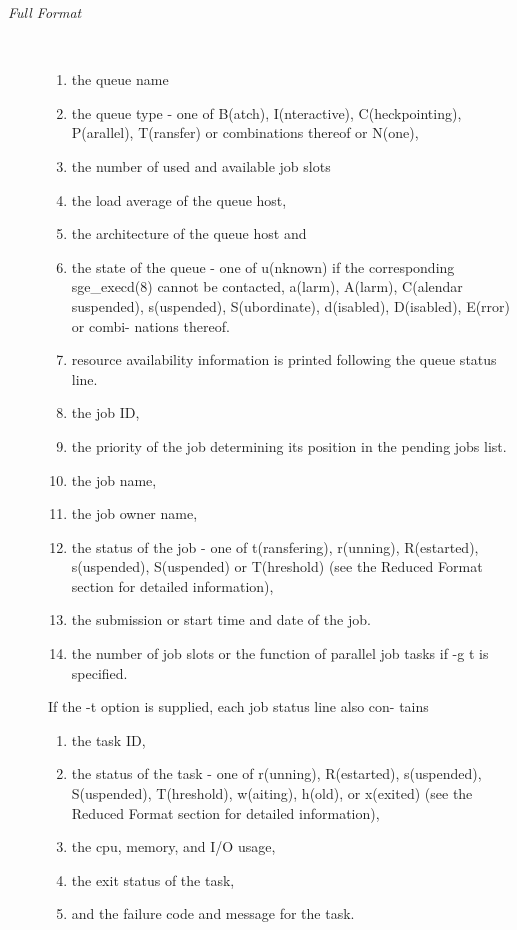 \documentclass[11pt,final,oneside]{fithesis}
\begin{document}
\begin{description}
\item[\emph{Full Format}]
\\
\begin{enumerate}
\item[] the queue name
\item[] the  queue  type  -  one   of   B(atch),   I(nteractive),
        C(heckpointing),  P(arallel),  T(ransfer) or combinations
        thereof or N(one),
\item[] the number of used and available job slots
\item[] the load average of the queue host,
\item[] the architecture of the queue host and
\item[] the state  of  the  queue  -  one  of  u(nknown)  if  the
        corresponding  sge\_execd(8) cannot be contacted, a(larm),
        A(larm),     C(alendar      suspended),      s(uspended),
        S(ubordinate),  d(isabled), D(isabled), E(rror) or combi-
        nations thereof.
\item[] resource availability information
     is  printed  following  the  queue  status  line.  
\item[] the job ID,
\item[] the priority of the job determining its position  in  the
        pending  jobs  list. 
\item[] the job name,
\item[] the job owner name,
\item[] the status of the job - one of t(ransfering),  r(unning),
        R(estarted), s(uspended), S(uspended) or T(hreshold) (see
        the Reduced Format section for detailed information),
\item[] the submission or start time and date of the job.
\item[] the number of job slots or the function of  parallel  job
        tasks if -g t is specified.
\end{enumerate}

If the -t option is supplied, each job status line also con-
     tains
     \begin{enumerate}

\item[] the task ID,
\item[] the status of the task - one of  r(unning),  R(estarted),
        s(uspended), S(uspended), T(hreshold), w(aiting), h(old),
        or x(exited) (see the Reduced Format section for detailed
        information),
\item[] the cpu, memory, and I/O usage,
\item[] the exit status of the task,
\item[] and the failure code and message for the task.
\end{enumerate}
\end{description}
 
\end{document}
